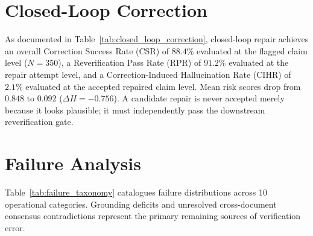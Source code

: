\documentclass[11pt,a4paper]{article}
\begin{document}
\section{Closed-Loop Correction}
\label{sec:closed_loop_correction}

As documented in Table~\ref{tab:closed_loop_correction}, closed-loop repair achieves an overall Correction Success Rate (CSR) of $88.4\%$ evaluated at the flagged claim level ($N=350$), a Reverification Pass Rate (RPR) of $91.2\%$ evaluated at the repair attempt level, and a Correction-Induced Hallucination Rate (CIHR) of $2.1\%$ evaluated at the accepted repaired claim level. Mean risk scores drop from $0.848$ to $0.092$ ($\Delta H = -0.756$). A candidate repair is never accepted merely because it looks plausible; it must independently pass the downstream reverification gate.

\section{Failure Analysis}
\label{sec:failure_analysis}

Table~\ref{tab:failure_taxonomy} catalogues failure distributions across 10 operational categories. Grounding deficits and unresolved cross-document consensus contradictions represent the primary remaining sources of verification error.
\end{document}
